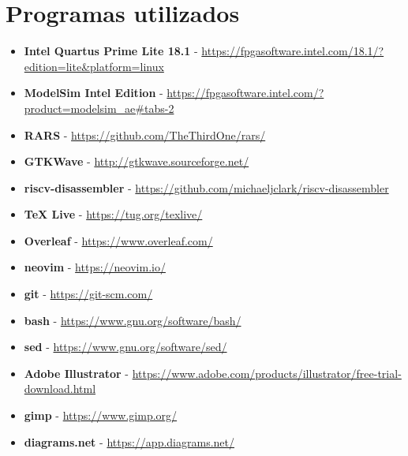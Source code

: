 \chapter{Programas utilizados}

\begin{itemize}
    \item \textbf{Intel Quartus Prime Lite 18.1} - \url{https://fpgasoftware.intel.com/18.1/?edition=lite&platform=linux}
    \item \textbf{ModelSim Intel Edition} - \url{https://fpgasoftware.intel.com/?product=modelsim_ae#tabs-2}
    \item \textbf{RARS} - \url{https://github.com/TheThirdOne/rars/}
    \item \textbf{GTKWave} - \url{http://gtkwave.sourceforge.net/}
    \item \textbf{riscv-disassembler} - \url{https://github.com/michaeljclark/riscv-disassembler}
    \item \textbf{TeX Live} - \url{https://tug.org/texlive/}
    \item \textbf{Overleaf} - \url{https://www.overleaf.com/}
    \item \textbf{neovim} - \url{https://neovim.io/}
    \item \textbf{git} - \url{https://git-scm.com/}
    \item \textbf{bash} - \url{https://www.gnu.org/software/bash/}
    \item \textbf{sed} - \url{https://www.gnu.org/software/sed/}
    \item \textbf{Adobe Illustrator} - \url{https://www.adobe.com/products/illustrator/free-trial-download.html}
    \item \textbf{gimp} - \url{https://www.gimp.org/}
    \item \textbf{diagrams.net} - \url{https://app.diagrams.net/}
\end{itemize}

